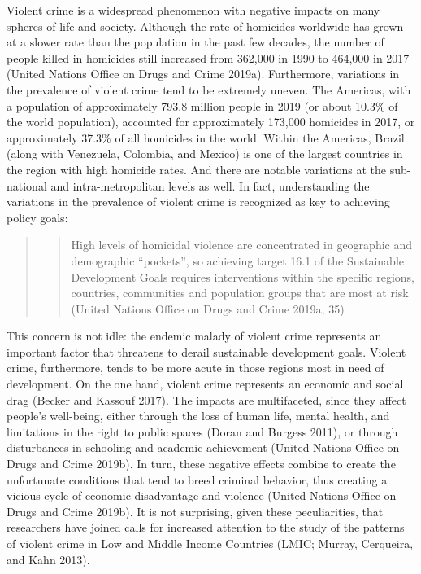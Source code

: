 \documentclass[smallextended]{svjour3}       %
\begin{document}
Violent crime is a widespread phenomenon with negative impacts on many
spheres of life and society. Although the rate of homicides worldwide
has grown at a slower rate than the population in the past few decades,
the number of people killed in homicides still increased from 362,000 in
1990 to 464,000 in 2017 (United Nations Office on Drugs and Crime
2019a). Furthermore, variations in the prevalence of violent crime tend
to be extremely uneven. The Americas, with a population of approximately
793.8 million people in 2019 (or about 10.3\% of the world population),
accounted for approximately 173,000 homicides in 2017, or approximately
37.3\% of all homicides in the world. Within the Americas, Brazil (along
with Venezuela, Colombia, and Mexico) is one of the largest countries in
the region with high homicide rates. And there are notable variations at
the sub-national and intra-metropolitan levels as well. In fact,
understanding the variations in the prevalence of violent crime is
recognized as key to achieving policy goals:

\begin{quote}
\begin{quote}
High levels of homicidal violence are concentrated in geographic and
demographic ``pockets'', so achieving target 16.1 of the Sustainable
Development Goals requires interventions within the specific regions,
countries, communities and population groups that are most at risk
(United Nations Office on Drugs and Crime 2019a, 35)
\end{quote}
\end{quote}

This concern is not idle: the endemic malady of violent crime represents
an important factor that threatens to derail sustainable development
goals. Violent crime, furthermore, tends to be more acute in those
regions most in need of development. On the one hand, violent crime
represents an economic and social drag (Becker and Kassouf 2017). The
impacts are multifaceted, since they affect people's well-being, either
through the loss of human life, mental health, and limitations in the
right to public spaces (Doran and Burgess 2011), or through disturbances
in schooling and academic achievement (United Nations Office on Drugs
and Crime 2019b). In turn, these negative effects combine to create the
unfortunate conditions that tend to breed criminal behavior, thus
creating a vicious cycle of economic disadvantage and violence (United
Nations Office on Drugs and Crime 2019b). It is not surprising, given
these peculiarities, that researchers have joined calls for increased
attention to the study of the patterns of violent crime in Low and
Middle Income Countries (LMIC; Murray, Cerqueira, and Kahn 2013).
\end{document}
